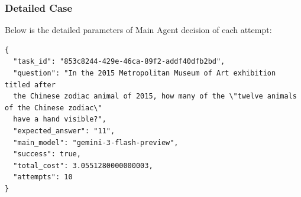 \subsubsection{Detailed Case}

Below is the detailed parameters of Main Agent decision of each attempt:
\begin{tcolorbox}[
  title={\textbf{\small Case Metadata (JSON)}},
  boxrule=1pt, arc=0mm,
  colback=gray!5, colframe=gray!70,
  breakable, before skip=8pt, after skip=10pt,
  pad at break=2mm, parbox=false
]
\begin{verbatim}
{
  "task_id": "853c8244-429e-46ca-89f2-addf40dfb2bd",
  "question": "In the 2015 Metropolitan Museum of Art exhibition titled after 
  the Chinese zodiac animal of 2015, how many of the \"twelve animals of the Chinese zodiac\"
  have a hand visible?",
  "expected_answer": "11",
  "main_model": "gemini-3-flash-preview",
  "success": true,
  "total_cost": 3.0551280000000003,
  "attempts": 10
}
\end{verbatim}
\end{tcolorbox}



\label{app:C1_gaia}

%

